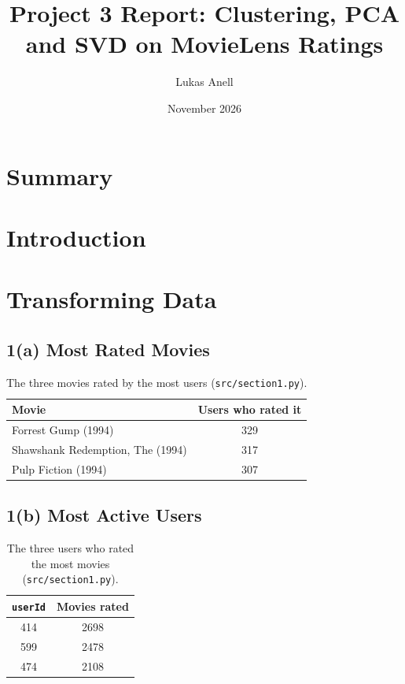 \documentclass[11pt]{article}
\title{Project 3 Report: Clustering, PCA and SVD on MovieLens Ratings}
\author{Lukas Anell}
\date{November 2026}
\begin{document}
\maketitle

\section*{Summary}


\section*{Introduction}


\section{Transforming Data}
\label{sec:s1}


\subsection*{1(a) Most Rated Movies}

\begin{table}[H]
    \centering
    \begin{tabular}{lc}
        \toprule
        Movie                            & Users who rated it \\
        \midrule
        Forrest Gump (1994)              & 329                \\
        Shawshank Redemption, The (1994) & 317                \\
        Pulp Fiction (1994)              & 307                \\
        \bottomrule
    \end{tabular}
    \caption{The three movies rated by the most users (\texttt{src/section1.py}).}
    \label{tab:top_items}
\end{table}

\subsection*{1(b) Most Active Users}

\begin{table}[H]
    \centering
    \begin{tabular}{cc}
        \toprule
        \texttt{userId} & Movies rated \\
        \midrule
        414             & 2698         \\
        599             & 2478         \\
        474             & 2108         \\
        \bottomrule
    \end{tabular}
    \caption{The three users who rated the most movies (\texttt{src/section1.py}).}
    \label{tab:top_users}
\end{table}
\end{document}
